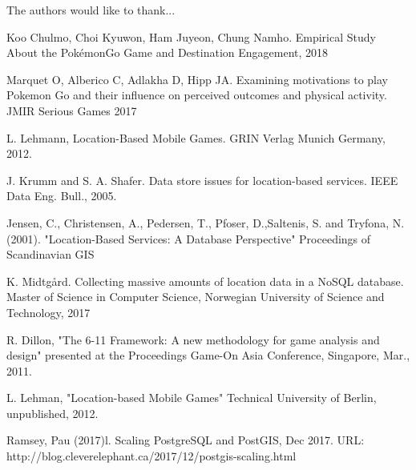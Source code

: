 \documentclass[conference]{IEEEtran}
\begin{document}
The authors would like to thank...


\begin{thebibliography}{1}
  
Koo Chulmo, Choi Kyuwon, Ham Juyeon, Chung Namho. Empirical Study About the PokémonGo Game and Destination Engagement, 2018

Marquet O, Alberico C, Adlakha D, Hipp JA. Examining motivations to play Pokemon Go and their influence on perceived
outcomes and physical activity. JMIR Serious Games 2017

L. Lehmann, Location-Based Mobile Games. GRIN Verlag Munich Germany, 2012.

J. Krumm and S. A. Shafer. Data store issues for location-based services. IEEE Data Eng. Bull., 2005.

Jensen, C., Christensen, A., Pedersen, T., Pfoser, D.,Saltenis, S. and Tryfona, N. (2001). "Location-Based Services: A Database Perspective" Proceedings of Scandinavian GIS

K. Midtgård. Collecting massive amounts of location data in a NoSQL database. Master of Science in Computer Science, Norwegian University of Science and Technology, 2017

R. Dillon, "The 6-11 Framework: A new methodology for game analysis and design" presented at the Proceedings Game-On Asia Conference, Singapore, Mar., 2011.

L. Lehman, "Location-based Mobile Games" Technical University of Berlin, unpublished, 2012.

Ramsey, Pau (2017)l. Scaling PostgreSQL and PostGIS, Dec 2017. URL: http://blog.cleverelephant.ca/2017/12/postgis-scaling.html

\end{thebibliography}
\end{document}
